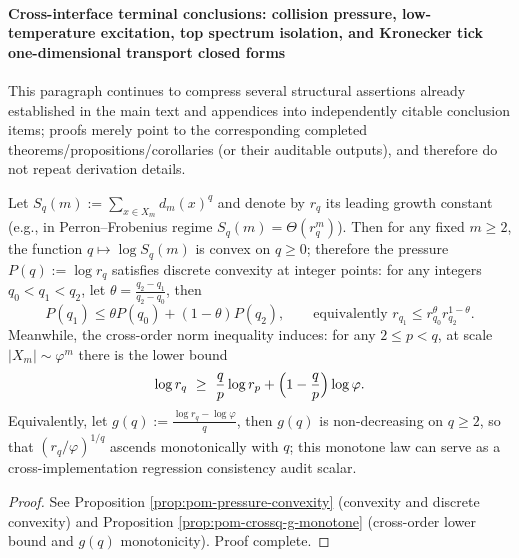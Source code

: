 
\paragraph{Cross-interface terminal conclusions: collision pressure, low-temperature excitation, top spectrum isolation, and Kronecker tick one-dimensional transport closed forms}
This paragraph continues to compress several structural assertions already established in the main text and appendices into independently citable conclusion items;
proofs merely point to the corresponding completed theorems/propositions/corollaries (or their auditable outputs), and therefore do not repeat derivation details.

\begin{conclusion}\label{con:xi-terminal-collision-pressure-discrete-convexity-crossq-g}
Let
\(
S_q(m):=\sum_{x\in X_m}d_m(x)^q
\)
and denote by \(r_q\) its leading growth constant (e.g., in Perron--Frobenius regime \(S_q(m)=\Theta(r_q^m)\)).
Then for any fixed \(m\ge 2\), the function \(q\mapsto \log S_q(m)\) is convex on \(q\ge 0\);
therefore the pressure \(P(q):=\log r_q\) satisfies discrete convexity at integer points: for any integers \(q_0<q_1<q_2\), let
\(
\theta=\frac{q_2-q_1}{q_2-q_0}
\),
then
\[
P(q_1)\le \theta P(q_0)+(1-\theta)P(q_2),
\qquad
\text{equivalently } r_{q_1}\le r_{q_0}^{\theta}r_{q_2}^{1-\theta}.
\]
Meanwhile, the cross-order norm inequality induces: for any \(2\le p<q\), at scale \(|X_m|\sim\varphi^m\) there is the lower bound
\[
\log r_q \ \ge\ \frac{q}{p}\log r_p+\Bigl(1-\frac{q}{p}\Bigr)\log\varphi.
\]
Equivalently, let
\(
g(q):=\frac{\log r_q-\log\varphi}{q}
\),
then \(g(q)\) is non-decreasing on \(q\ge 2\), so that \((r_q/\varphi)^{1/q}\) ascends monotonically with \(q\);
this monotone law can serve as a cross-implementation regression consistency audit scalar.
\end{conclusion}
\begin{proof}[Proof]
See Proposition \ref{prop:pom-pressure-convexity} (convexity and discrete convexity) and Proposition \ref{prop:pom-crossq-g-monotone} (cross-order lower bound and \(g(q)\) monotonicity). Proof complete.
\end{proof}

